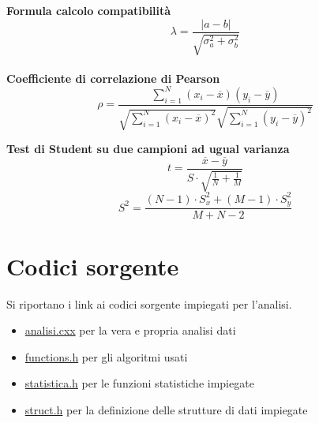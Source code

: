 \documentclass[a4paper,11pt,oneside]{article}
\begin{document}
\textbf{Formula calcolo compatibilità}\\
\begin{equation*}
    \lambda=\frac{\left|a-b\right|}{\sqrt{\sigma^{2}_{a}+\sigma^{2}_{b}}}
\end{equation*}\\
\textbf{Coefficiente di correlazione di Pearson}\\
\begin{equation*}
    \rho=  \frac{\sum_{i=1}^{N}(x_i - \overline{x}
    )(y_i - \overline{y})}{\sqrt{\sum_{i=1}^{N}(x_i -\overline{x})^2}\sqrt{\sum_{i=1}^{N}(y_i - \overline{y})^2}}
\end{equation*}\textbf{
}

\textbf{Test di Student su due campioni ad ugual varianza}\\
\begin{equation*}
    t=\frac{\overline{x}-\overline{y}}{S\cdot \sqrt{\frac{1}{N}+\frac{1}{M}}}
\end{equation*}
\begin{equation*}
    S^2=\frac{(N-1)\cdot S_{x}^2+(M-1)\cdot S_{y}^2}{M+N-2}
\end{equation*}

\section{Codici sorgente}
Si riportano i link ai codici sorgente impiegati per l'analisi.
\begin{itemize}
    \item \href{https://github.com/badbigota/6_relazione/blob/master/Programmi/analisi.cxx}{analisi.cxx} per la vera e propria analisi dati 
    \item \href{https://github.com/badbigota/6_relazione/blob/master/Programmi/functions.h}{functions.h} per gli algoritmi usati
    \item \href{https://github.com/badbigota/6_relazione/blob/master/Programmi/statistica.h}{statistica.h} per le funzioni statistiche impiegate
    \item\href{https://github.com/badbigota/6_relazione/blob/master/Programmi/struct.h}{struct.h} per la definizione delle strutture di dati impiegate
\end{itemize}
\end{document}
